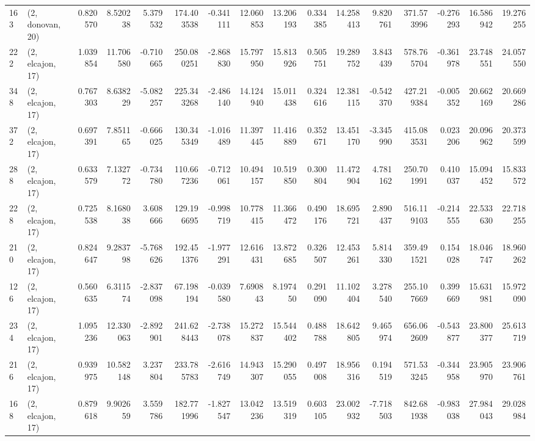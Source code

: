 \begin{tabular}{llrrrrrrrrrrrrrr}
163 &  (2, donovan, 20) &   0.820570 &   8.520238 &   5.379532 &   174.403538 &  -0.341111 &  12.060853 &  13.206193 &  0.334385 &  14.258413 &   9.820761 &    371.573996 &   -0.276293 &   16.586942 &   19.276255 \\
222 &  (2, elcajon, 17) &   1.039854 &  11.706580 &  -0.710665 &   250.080251 &  -2.868830 &  15.797950 &  15.813926 &  0.505751 &  19.289752 &   3.843439 &    578.765704 &   -0.361978 &   23.748551 &   24.057550 \\
348 &  (2, elcajon, 17) &   0.767303 &   8.638229 &  -5.082257 &   225.343268 &  -2.486140 &  14.124940 &  15.011438 &  0.324616 &  12.381115 &  -0.542370 &    427.219384 &   -0.005352 &   20.662169 &   20.669286 \\
372 &  (2, elcajon, 17) &   0.697391 &   7.851165 &  -0.666025 &   130.345349 &  -1.016489 &  11.397445 &  11.416889 &  0.352671 &  13.451170 &  -3.345990 &    415.083531 &    0.023206 &   20.096962 &   20.373599 \\
288 &  (2, elcajon, 17) &   0.633579 &   7.132772 &  -0.734780 &   110.667236 &  -0.712061 &  10.494157 &  10.519850 &  0.300804 &  11.472904 &   4.781162 &    250.701991 &    0.410037 &   15.094452 &   15.833572 \\
228 &  (2, elcajon, 17) &   0.725538 &   8.168038 &   3.608666 &   129.196695 &  -0.998719 &  10.778415 &  11.366472 &  0.490176 &  18.695721 &   2.890437 &    516.119103 &   -0.214555 &   22.533630 &   22.718255 \\
210 &  (2, elcajon, 17) &   0.824647 &   9.283798 &  -5.768626 &   192.451376 &  -1.977291 &  12.616431 &  13.872685 &  0.326507 &  12.453261 &   5.814330 &    359.491521 &    0.154028 &   18.046747 &   18.960262 \\
126 &  (2, elcajon, 17) &   0.560635 &   6.311574 &  -2.837098 &    67.198194 &  -0.039580 &   7.690843 &   8.197450 &  0.291090 &  11.102404 &   3.278540 &    255.107669 &    0.399669 &   15.631981 &   15.972090 \\
234 &  (2, elcajon, 17) &   1.095236 &  12.330063 &  -2.892901 &   241.628443 &  -2.738078 &  15.272837 &  15.544402 &  0.488788 &  18.642805 &   9.465974 &    656.062609 &   -0.543877 &   23.800377 &   25.613719 \\
216 &  (2, elcajon, 17) &   0.939975 &  10.582148 &   3.237804 &   233.785783 &  -2.616749 &  14.943307 &  15.290055 &  0.497008 &  18.956316 &   0.194519 &    571.533245 &   -0.344958 &   23.905970 &   23.906761 \\
168 &  (2, elcajon, 17) &   0.879618 &   9.902659 &   3.559786 &   182.771996 &  -1.827547 &  13.042236 &  13.519319 &  0.603105 &  23.002932 &  -7.718503 &    842.681938 &   -0.983038 &   27.984043 &   29.028984 \\

\end{tabular}
